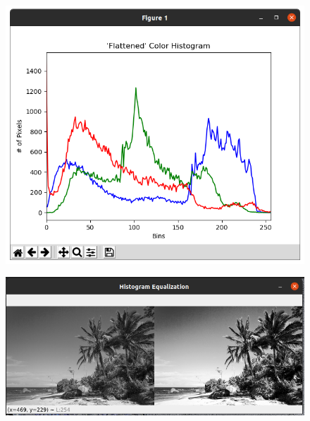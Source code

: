 \documentclass[12pt,letterpaper]{article}
\begin{document}
\begin{multicols}{2}
\begin{figure}[H]
\centering
\includegraphics[width = \columnwidth]{Resultado2_ch7_1.png}
\end{figure} 


\begin{figure}[H]
\centering
\includegraphics[width = \columnwidth]{Resultado_ch7_2.png}
\end{figure} 



\end{multicols}
\end{document}
